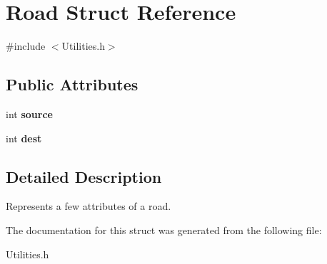 \hypertarget{struct_road}{}\section{Road Struct Reference}
\label{struct_road}


{\ttfamily \#include $<$Utilities.\+h$>$}

\subsection*{Public Attributes}
\begin{DoxyCompactItemize}
\item 
int {\bfseries source}\hypertarget{struct_road_a478ad425e1564b7b3fc2f2db78a2b9cd}{}\label{struct_road_a478ad425e1564b7b3fc2f2db78a2b9cd}

\item 
int {\bfseries dest}\hypertarget{struct_road_a233ad052f52b86cfe4177784c3f574ad}{}\label{struct_road_a233ad052f52b86cfe4177784c3f574ad}

\end{DoxyCompactItemize}


\subsection{Detailed Description}
Represents a few attributes of a road. 

The documentation for this struct was generated from the following file\+:\begin{DoxyCompactItemize}
\item 
Utilities.\+h\end{DoxyCompactItemize}
